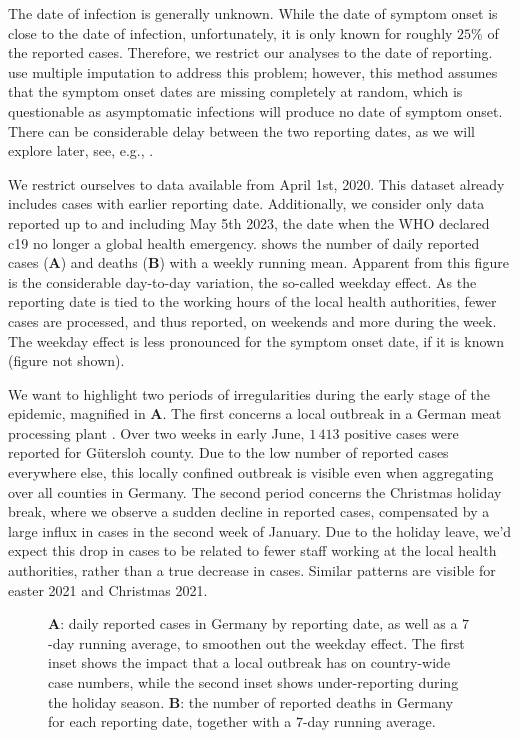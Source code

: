 The date of infection is generally unknown. While the date of symptom onset is close to the date of infection, unfortunately, it is only known for roughly $25\%$ of the reported cases. Therefore, we restrict our analyses to the date of reporting. \citep{AnDerHeiden2020Schatzung} use multiple imputation to address this problem; however, this method assumes that the symptom onset dates are missing completely at random, which is questionable as asymptomatic infections will produce no date of symptom onset. There can be considerable delay between the two reporting dates, as we will explore later, see, e.g., .

We restrict ourselves to data available from April 1st, 2020. This dataset already includes cases with earlier reporting date. Additionally, we consider only data reported up to and including May 5th 2023, the date when the WHO declared \acrshort{c19} no longer a global health emergency.  shows the number of daily reported cases (\textbf{A}) and deaths (\textbf{B}) with a weekly running mean. Apparent from this figure is the considerable day-to-day variation, the so-called weekday effect. As the reporting date is tied to the working hours of the local health authorities, fewer cases are processed, and thus reported, on weekends and more during the week. The weekday effect is less pronounced for the symptom onset date, if it is known (figure not shown). 

We want to highlight two periods of irregularities during the early stage of the epidemic, magnified in  \textbf{A}. The first concerns a local outbreak in a German meat processing plant \citep{Gunther2020SARSCoV2}. Over two weeks in early June, $1\,413$ positive cases were reported for Gütersloh county. Due to the low number of reported cases everywhere else, this locally confined outbreak is visible even when aggregating over all counties in Germany. 
The second period concerns the Christmas holiday break, where we observe a sudden decline in reported cases, compensated by a large influx in cases in the second week of January. Due to the holiday leave, we'd expect this drop in cases to be related to fewer staff working at the local health authorities, rather than a true decrease in cases. Similar patterns are visible for easter 2021 and Christmas 2021. 

\begin{figure}
    \resizebox{\textwidth}{!}{%
    }
    \caption{\textbf{A}: daily reported cases in Germany by reporting date, as well as a $7$-day running average, to smoothen out the weekday effect. The first inset shows the impact that a local outbreak \citep{Gunther2020SARSCoV2} has on country-wide case numbers, while the second inset shows under-reporting during the holiday season.  \textbf{B}: the number of reported deaths in Germany for each reporting date, together with a $7$-day running average.}
    \label{fig:cases_germany}
\end{figure}




